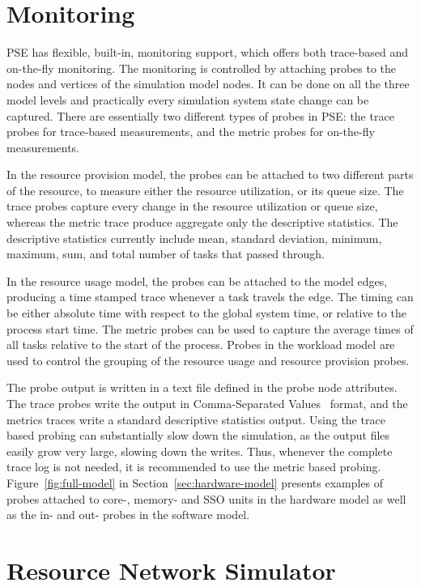 \section{Monitoring}

PSE has flexible, built-in, monitoring support, which offers both trace-based and on-the-fly monitoring. The monitoring is controlled by attaching probes to the nodes and vertices of the simulation model nodes. It can be done on all the three model levels and practically every simulation system state change can be captured. There are essentially two different types of probes in PSE: the trace probes for trace-based measurements, and the metric probes for on-the-fly measurements.

In the resource provision model, the probes can be attached to two different parts of the resource, to measure either the resource utilization, or its queue size. The trace probes capture every change in the resource utilization or queue size, whereas the metric trace produce aggregate only the descriptive statistics. The descriptive statistics currently include mean, standard deviation, minimum, maximum, sum, and total number of tasks that passed through.

In the resource usage model, the probes can be attached to the model edges, producing a time stamped trace whenever a task travels the edge. The timing can be either absolute time with respect to the global system time, or relative to the process start time. The metric probes can be used to capture the average times of all tasks relative to the start of the process. Probes in the workload model are used to control the grouping of the resource usage and resource provision probes.

The probe output is written in a text file defined in the probe node attributes. The trace probes write the output in Comma-Separated Values~\cite{Shafranovic:2005:CSV} format, and the metrics traces write a standard descriptive statistics output. Using the trace based probing can substantially slow down the simulation, as the output files easily grow very large, slowing down the writes. Thus, whenever the complete trace log is not needed, it is recommended to use the metric based probing. Figure~\ref{fig:full-model} in Section~\ref{sec:hardware-model} presents examples of probes attached to core-, memory- and SSO units in the hardware model as well as the in- and out- probes in the software model.

\section{Resource Network Simulator}
\label{sec:resource-network-simulator}

